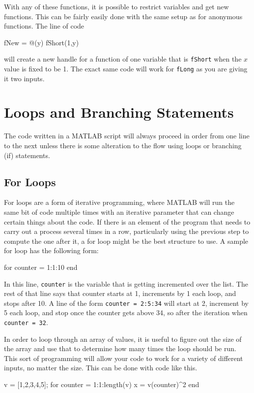 With any of these functions, it is possible to restrict variables and get new functions. This can be fairly easily done with the same setup as for anonymous functions. The line of code
\begin{matlab}
fNew = @(y) fShort(1,y)
\end{matlab}
will create a new handle for a function of one variable that is \texttt{fShort} when the $x$ value is fixed to be 1. The exact same code will work for \texttt{fLong} as you are giving it two inputs. 

\section{Loops and Branching Statements}

The code written in a MATLAB script will always proceed in order from one line to the next unless there is some alteration to the flow using loops or branching (if) statements. 

\subsection{For Loops}
For loops are a form of iterative programming, where MATLAB will run the same bit of code multiple times with an iterative parameter that can change certain things about the code. If there is an element of the program that needs to carry out a process several times in a row, particularly using the previous step to compute the one after it, a for loop might be the best structure to use. A sample for loop has the following form:
\begin{matlab}
for counter = 1:1:10
end
\end{matlab}

In this line, \texttt{counter} is the variable that is getting incremented over the list. The rest of that line says that counter starts at 1, increments by 1 each loop, and stops after 10. A line of the form \texttt{counter = 2:5:34} will start at 2, increment by 5 each loop, and stop once the counter gets above 34, so after the iteration when \texttt{counter = 32}.

In order to loop through an array of values, it is useful to figure out the size of the array and use that to determine how many times the loop should be run. This sort of programming will allow your code to work for a variety of different inputs, no matter the size. This can be done with code like this.
\begin{matlab}
v = [1,2,3,4,5]; %
for counter = 1:1:length(v)
    x = v(counter)^2
end
\end{matlab}

